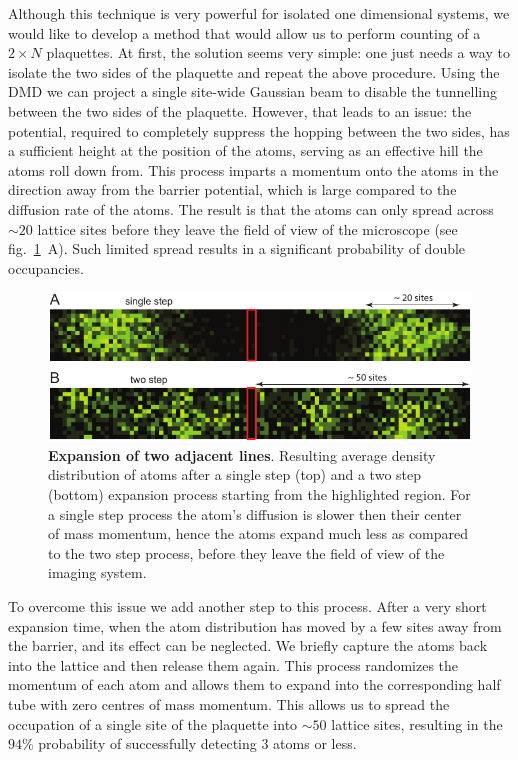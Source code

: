 Although this technique is very powerful for isolated one dimensional systems, we would like to develop a method that would allow us to perform counting of a $2\times N$ plaquettes. At first, the solution seems very simple: one just needs a way to isolate the two sides of the plaquette and repeat the above procedure. Using the DMD we can project a single site-wide Gaussian beam to disable the tunnelling between the two sides of the plaquette. However, that leads to an issue: the potential, required to completely suppress the hopping between the two sides, has a sufficient height at the position of the atoms, serving as an effective hill the atoms roll down from. This process imparts a momentum onto the atoms in the direction away from the barrier potential, which is large compared to the diffusion rate of the atoms. The result is that the atoms can only spread across $\sim 20$ lattice sites before they leave the field of view of the microscope (see fig.~\ref{fig:CTE_expansion}~A). Such limited spread results in a significant probability of double occupancies.

\begin{figure}[t]
	\centering
	\includegraphics[scale=1]{figures/CTE_expansion.pdf}
	\caption{{\bf Expansion of two adjacent lines}. Resulting average density distribution of atoms after a single step (top) and a two step (bottom) expansion process starting from the highlighted region. For a single step process the atom's diffusion is slower then their center of mass momentum, hence the atoms expand much less as compared to the two step process, before they leave the field of view of the imaging system.}
	\label{fig:CTE_expansion}
\end{figure}

To overcome this issue we add another step to this process. After a very short expansion time, when the atom distribution has moved by a few sites away from the barrier, and its effect can be neglected. We briefly capture the atoms back into the lattice and then release them again. This process randomizes the momentum of each atom and allows them to expand into the corresponding half tube with zero centres of mass momentum. This allows us to spread the occupation of a single site of the plaquette into $\sim 50$ lattice sites, resulting in the $94\%$ probability of successfully detecting $3$ atoms or less. 